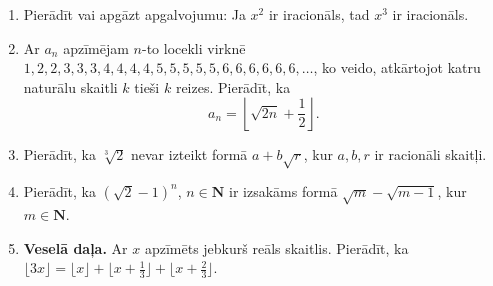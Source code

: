 \documentclass[a4paper,12pt]{article}
\newcommand\N{\mathbf{N}}
\begin{document}
\begin{enumerate}
\item 
Pierādīt vai apgāzt apgalvojumu: Ja $x^2$ ir iracionāls, tad $x^3$ ir iracionāls.

\item 
Ar $a_n$ apzīmējam $n$-to locekli virknē $1, 2,2, 3,3,3, 4,4,4,4, 5,5,5,5,5, 6,6,6,6,6,6,\ldots$, 
ko veido, atkārtojot katru naturālu skaitli $k$ tieši $k$ reizes. Pierādīt, ka
\[ a_n = \left\lfloor \sqrt{2n} + \frac{1}{2} \right\rfloor. \]


\item 
Pierādīt, ka $\sqrt[3]{2}$ nevar izteikt formā $a + b\sqrt{r}$, kur $a,b,r$ ir racionāli skaitļi. 

\item 
Pierādīt, ka $(\sqrt{2} - 1)^n$, $n \in \N$ ir izsakāms formā $\sqrt{m} - \sqrt{m-1}$, kur $m \in \N$.


\item {\bf Veselā daļa.} 
Ar $x$ apzīmēts jebkurš reāls skaitlis. Pierādīt, ka 
$\lfloor 3x \rfloor = \lfloor x \rfloor + \lfloor x + \frac{1}{3} \rfloor +
\lfloor x + \frac{2}{3} \rfloor$.





\end{enumerate}
\end{document}
